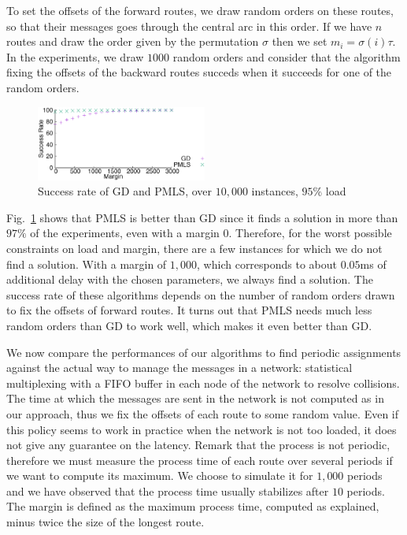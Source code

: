 \documentclass[10pt, conference, letterpaper]{IEEEtran}
\begin{document}
   
   To set the offsets of the forward routes, we draw random orders on these routes, so that their messages goes through 
   the central arc in this order. If we have $n$ routes and draw the order given by the permutation $\sigma$ then we set $m_{i} = \sigma(i)\tau$. In the experiments, we draw $1000$ random orders and consider that the algorithm fixing the offsets of the backward routes succeds when it succeeds for one of the random orders.
      
     
    \begin{figure} 
       \begin{center}
      \includegraphics[width=0.5\textwidth]{retour_21000.eps}
      \end{center}
      \caption{Success rate of GD and PMLS, over $10,000$ instances, $95\%$ load}
     \label{fig:success21000}
    
     \end{figure}
        
     
Fig.~\ref{fig:success21000} shows that PMLS is better than GD since it finds a solution in more than $97\%$ of the experiments, even with a margin $0$. Therefore, for the worst possible constraints on load and margin, there are a few instances for which we do not find a solution. With a margin of $1,000$, which corresponds to about $0.05$ms of additional delay with the chosen parameters, we always find a solution. The success rate of these algorithms depends on the number of random orders drawn to fix the offsets of forward routes. It turns out that PMLS needs much less random orders than GD to work well, which makes it even better than GD.   


    We now compare the performances of our algorithms to find periodic assignments against the actual way to manage the messages in a network:  statistical multiplexing with a FIFO buffer in each node of the network to resolve collisions. The time at which the messages are sent in the network is not computed as in our approach, thus we fix the offsets of each route to some random value.
     Even if this policy seems to work in practice when the network is not too loaded, it does not give any guarantee on the latency. Remark that the process is not periodic, therefore we must measure the process time of each route over several periods if we want to compute its maximum. We choose to simulate it for $1,000$ periods and we have observed that the process time usually stabilizes after $10$ periods. The margin is defined as the maximum process time, computed as explained, minus twice the size of the longest route. 
	    
\end{document}
